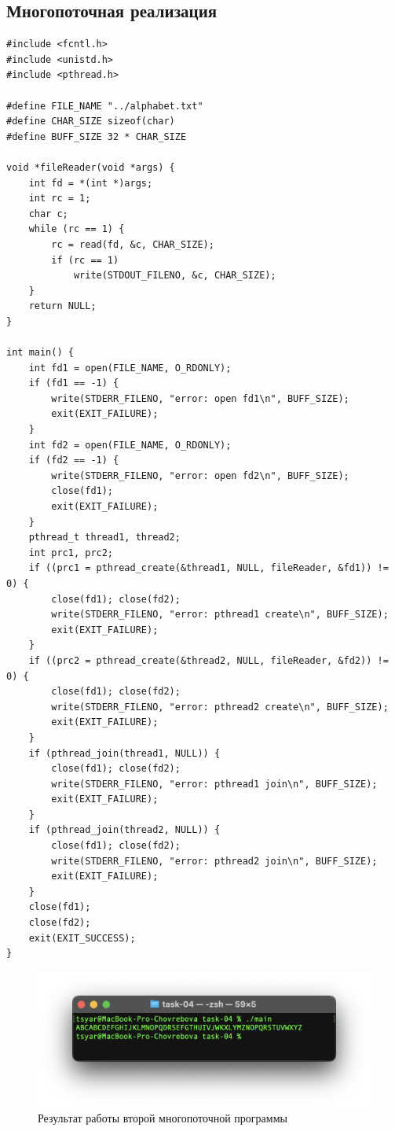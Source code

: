 \subsection*{Многопоточная реализация}
\begin{lstlisting}[caption=Многопоточная программа c двумя дополнительными потоками,label=lst:FILEstruct11111]
#include <fcntl.h>
#include <unistd.h>
#include <pthread.h>

#define FILE_NAME "../alphabet.txt"
#define CHAR_SIZE sizeof(char)
#define BUFF_SIZE 32 * CHAR_SIZE

void *fileReader(void *args) {
	int fd = *(int *)args;
	int rc = 1;
	char c;
	while (rc == 1) {
		rc = read(fd, &c, CHAR_SIZE);
		if (rc == 1)
			write(STDOUT_FILENO, &c, CHAR_SIZE);
	}
	return NULL;
}

int main() {
	int fd1 = open(FILE_NAME, O_RDONLY);
	if (fd1 == -1) {
		write(STDERR_FILENO, "error: open fd1\n", BUFF_SIZE);
		exit(EXIT_FAILURE);
	}
	int fd2 = open(FILE_NAME, O_RDONLY);
	if (fd2 == -1) {
		write(STDERR_FILENO, "error: open fd2\n", BUFF_SIZE);
		close(fd1);
		exit(EXIT_FAILURE);
	}
	pthread_t thread1, thread2;
	int prc1, prc2;
	if ((prc1 = pthread_create(&thread1, NULL, fileReader, &fd1)) != 0) {
		close(fd1); close(fd2);
		write(STDERR_FILENO, "error: pthread1 create\n", BUFF_SIZE);
		exit(EXIT_FAILURE);
	}
	if ((prc2 = pthread_create(&thread2, NULL, fileReader, &fd2)) != 0) {
		close(fd1); close(fd2);
		write(STDERR_FILENO, "error: pthread2 create\n", BUFF_SIZE);
		exit(EXIT_FAILURE);
	}
	if (pthread_join(thread1, NULL)) {
		close(fd1); close(fd2);
		write(STDERR_FILENO, "error: pthread1 join\n", BUFF_SIZE);
		exit(EXIT_FAILURE);
	}
	if (pthread_join(thread2, NULL)) {
		close(fd1); close(fd2);
		write(STDERR_FILENO, "error: pthread2 join\n", BUFF_SIZE);
		exit(EXIT_FAILURE);
	}
	close(fd1);
	close(fd2);
	exit(EXIT_SUCCESS);
}
\end{lstlisting}

\begin{figure}[h!] 
	\centering
	\includegraphics[width=1.0\textwidth]{./img/second-02.png}
	\caption{Результат работы второй многопоточной программы}
	\label{fig:22}
\end{figure}


